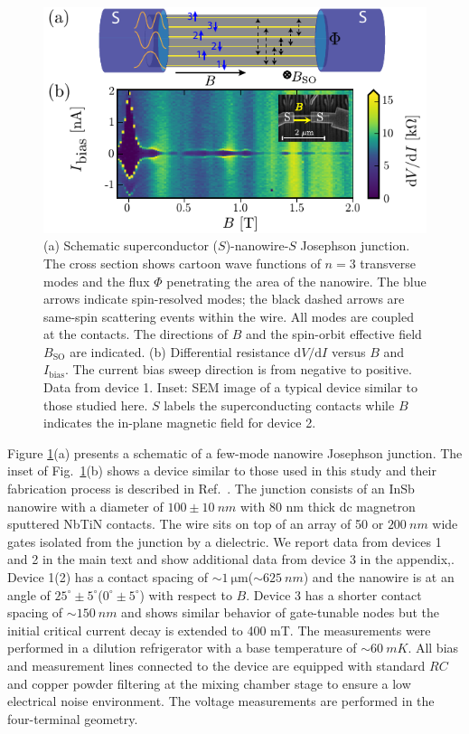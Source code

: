 \begin{figure}[ht]
\includegraphics[width=\columnwidth]{chapter_supercurrent/figures/fig1.pdf}
\caption{(a) Schematic superconductor ($S$)-nanowire-$S$ Josephson junction. The cross section shows cartoon wave functions of $n=3$ transverse modes and the flux $\Phi$ penetrating the area of the nanowire. The blue arrows indicate spin-resolved modes; the black dashed arrows are same-spin scattering events within the wire. All modes are coupled at the contacts.
The directions of $B$ and the spin-orbit effective field $B_\mathrm{SO}$ are indicated. (b) Differential resistance $\mathrm{d}V/\mathrm{d}I$ versus $B$ and $I_\mathrm{bias}$.
The current bias sweep direction is from negative to positive. Data from device 1. Inset: SEM image of a typical device similar to those studied here. $S$ labels the superconducting contacts while $B$ indicates the in-plane magnetic field for device 2.}
\label{fig:figure1}
\end{figure}

Figure \ref{fig:figure1}(a) presents a schematic of a few-mode nanowire Josephson junction.
The inset of Fig.~\ref{fig:figure1}(b) shows a device similar to those used in this study and their fabrication process is described in Ref.~\cite{Mourik2012}.
The junction consists of an InSb nanowire with a diameter of $100 \pm \SI{10}{nm}$ with 80 nm thick dc magnetron sputtered NbTiN contacts.
The wire sits on top of an array of 50 or $\SI{200}{nm}$ wide gates isolated from the junction by a dielectric.
We report data from devices 1 and 2 in the main text and show additional data from device 3 in the appendix,.
Device 1(2) has a contact spacing of $\sim \SI{1}{\micro \m}$($\sim \SI{625}{nm}$) and the nanowire is at an angle of $25^\circ \pm 5^\circ$($0^\circ \pm 5^\circ$) with respect to $B$.
Device 3 has a shorter contact spacing of $\sim \SI{150}{nm}$ and shows similar behavior of gate-tunable nodes but the initial critical current decay is extended to 400 mT.
The measurements were performed in a dilution refrigerator with a base temperature of $\sim\SI{60}{mK}$.
All bias and measurement lines connected to the device are equipped with standard $RC$ and copper powder filtering at the mixing chamber stage to ensure a low electrical noise environment.
The voltage measurements are performed in the four-terminal geometry.

